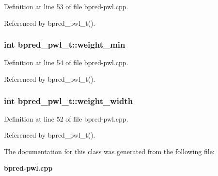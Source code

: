 Definition at line 53 of file bpred-pwl.cpp.

Referenced by bpred\_\-pwl\_\-t().
\subsubsection[{weight\_\-min}]{\setlength{\rightskip}{0pt plus 5cm}int {\bf bpred\_\-pwl\_\-t::weight\_\-min}\hspace{0.3cm}{\tt  [protected]}}\label{classbpred__pwl__t_364073802837aeecbe895a5bc95c1747}




Definition at line 54 of file bpred-pwl.cpp.

Referenced by bpred\_\-pwl\_\-t().
\subsubsection[{weight\_\-width}]{\setlength{\rightskip}{0pt plus 5cm}int {\bf bpred\_\-pwl\_\-t::weight\_\-width}\hspace{0.3cm}{\tt  [protected]}}\label{classbpred__pwl__t_27efd9866d95d093da339bacb4af1676}




Definition at line 52 of file bpred-pwl.cpp.

Referenced by bpred\_\-pwl\_\-t().

The documentation for this class was generated from the following file:\begin{CompactItemize}
\item 
{\bf bpred-pwl.cpp}\end{CompactItemize}
